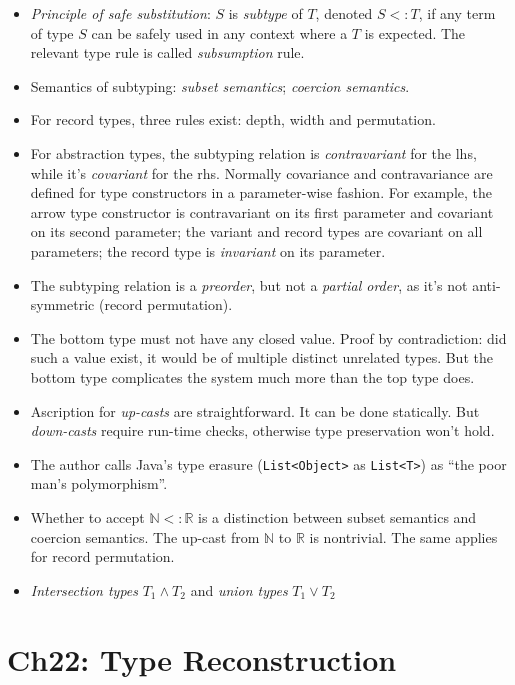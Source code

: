 \documentclass{article}
\newcommand{\nset}{\mathbb{N}}
\newcommand{\rset}{\mathbb{R}}
\begin{document}
  \begin{itemize}
    \item \emph{Principle of safe substitution}: $S$ is \emph{subtype} of $T$, denoted $S <: T$,
      if any term of type $S$ can be safely used in any context where a $T$ is expected.
      The relevant type rule is called \emph{subsumption} rule.
    \item Semantics of subtyping: \emph{subset semantics}; \emph{coercion semantics}.
    \item For record types, three rules exist: depth, width and permutation.
    \item For abstraction types, the subtyping relation is \emph{contravariant} for the lhs,
      while it's \emph{covariant} for the rhs.
      Normally covariance and contravariance are defined for type constructors in a parameter-wise fashion.
      For example, the arrow type constructor is contravariant on its first parameter and covariant on its second parameter;
      the variant and record types are covariant on all parameters;
      the record type is \emph{invariant} on its parameter.
    \item The subtyping relation is a \emph{preorder}, but not a \emph{partial order},
      as it's not anti-symmetric (record permutation).
    \item The bottom type must not have any closed value.
      Proof by contradiction:
      did such a value exist, it would be of multiple distinct unrelated types.
      But the bottom type complicates the system much more than the top type does.
    \item Ascription for \emph{up-casts} are straightforward.
      It can be done statically.
      But \emph{down-casts} require run-time checks,
      otherwise type preservation won't hold.
    \item The author calls Java's type erasure (\verb|List<Object>| as \verb|List<T>|)
      as ``the poor man's polymorphism''.
    \item Whether to accept $\nset <: \rset$ is a distinction between subset semantics and coercion semantics.
      The up-cast from $\nset$ to $\rset$ is nontrivial. The same applies for record permutation.
    \item \emph{Intersection types} $T_1 \land T_2$ and \emph{union types} $T_1 \lor T_2$
  \end{itemize}



\section{Ch22: Type Reconstruction}
\end{document}
